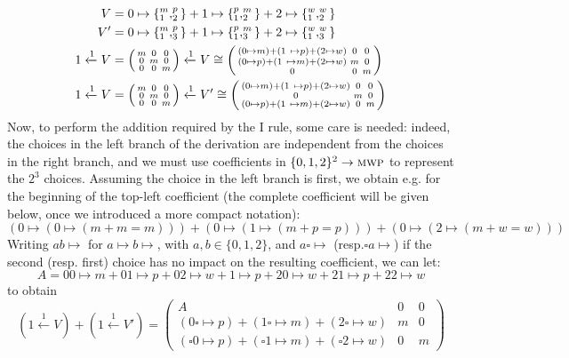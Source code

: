 \documentclass[runningheads]{llncs}
\makeatletter
\newcommand{\mat}[1]{\left(\begin{smallmatrix}#1\end{smallmatrix}\right)} %
\newcommand{\pr}{\lstinline[mathescape]}
\newcommand*{\eg}{e.g.\@\xspace}
\newcommand*{\resp}{resp.\@\xspace}
\renewcommand{\oplus}{+}
\makeatother
\begin{document}
\begin{example}
	\begin{align*}
		V                  & = 0 \mapsto \{_{\text{\pr|1|}}^{m}, _{\text{\pr|2|}}^{p}\} \oplus 1 \mapsto \{_{\text{\pr|1|}}^{p}, _{\text{\pr|2|}}^{m}\} \oplus 2 \mapsto \{_{\text{\pr|1|}}^{w}, _{\text{\pr|2|}}^{w}\}         \\
		V'                 & = 0 \mapsto \{_{\text{\pr|1|}}^{m}, _{\text{\pr|3|}}^{p}\} \oplus 1 \mapsto \{_{\text{\pr|1|}}^{p}, _{\text{\pr|3|}}^{m}\} \oplus 2 \mapsto \{_{\text{\pr|1|}}^{w}, _{\text{\pr|3|}}^{w}\}         \\
		1 \xleftarrow{1} V & = \mat{m                                                                                                                                                                                   & 0 & 0 \\ 0 & m & 0 \\ 0 & 0 & m} \xleftarrow{1} V \cong \mat{(0 \mapsto m) \oplus (1 \mapsto p) \oplus (2 \mapsto w) & 0 & 0 \\ (0 \mapsto p) + (1 \mapsto m) + (2 \mapsto w) & m & 0 \\ 0 & 0 & m} \\
		1 \xleftarrow{1} V & = \mat{m                                                                                                                                                                                   & 0 & 0 \\ 0 & m & 0 \\ 0 & 0 & m } \xleftarrow{1} V' \cong \mat{(0 \mapsto m) \oplus (1 \mapsto p) \oplus (2 \mapsto w) & 0 & 0 \\ 0 & m & 0 \\ (0 \mapsto p) \oplus (1 \mapsto m) \oplus (2 \mapsto w) & 0 & m}
	\end{align*}
	Now, to perform the addition required by the I rule, some care is needed: indeed, the choices in the left branch of the derivation are independent from the choices in the right branch, and we must use coefficients in \(\{0, 1, 2\}^2 \to \textsc{mwp}\) to represent the \(2^3\) choices.
	Assuming the choice in the left branch is first, we obtain \eg for the beginning of the top-left coefficient (the complete coefficient will be given below, once we introduced a more compact notation):
	\[(0 \mapsto (0 \mapsto (m + m = m)))
		+ (0 \mapsto (1 \mapsto (m + p = p)))
		+ (0 \mapsto (2 \mapsto (m + w = w)))
	\]
	Writing \(ab \mapsto\) for \(a \mapsto b \mapsto\), with \(a, b \in \{0, 1, 2\}\), and \(a\square \mapsto\) (\resp \(\square a \mapsto\)) if the second (\resp first) choice has no impact on the resulting coefficient, we can let:
	\[ A = 00\mapsto m + 01 \mapsto p + 02 \mapsto w + 1 \mapsto p + 20 \mapsto w + 21 \mapsto p + 22 \mapsto w\]
	to obtain
	\[(1 \xleftarrow{1} V) + (1 \xleftarrow{1} V') = \mat{A & 0 & 0 \\ (0\square \mapsto p) + (1\square \mapsto m) + (2\square \mapsto w) & m & 0 \\ (\square 0 \mapsto p) \oplus (\square 1 \mapsto m) \oplus (\square 2 \mapsto w) & 0 & m}\]


\end{example}
\end{document}
